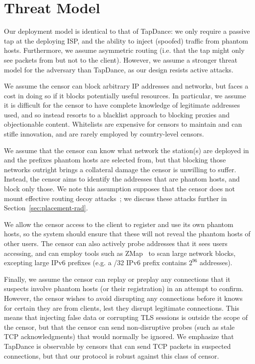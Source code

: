 \documentclass[sigconf]{acmart}
\begin{document}




\section{Threat Model}


Our deployment model is identical to that of TapDance: we only require a passive
tap at the deploying ISP, and the ability to inject (spoofed) traffic from phantom
hosts.
Furthermore, we assume
asymmetric routing (i.e. that the tap might only see packets from but not to the
client).
However, we assume a stronger threat model for the adversary than
TapDance, as our design resists active attacks.

We assume the censor can block arbitrary IP addresses and networks, but faces a
cost in doing so if it blocks potentially useful resources. In particular, we
assume it is difficult for the censor to have complete knowledge of legitimate
addresses used, and so instead resorts to a blacklist approach to blocking
proxies and objectionable content.
Whitelists are expensive for censors to maintain and can stifle
innovation, and are rarely employed by country-level censors.

We assume that the censor can know what network the \scheme station(s) are
deployed in and the prefixes phantom hosts are selected from, but that blocking those
networks outright brings a collateral
damage the censor is unwilling to suffer. Instead, the censor aims to identify
the addresses that are phantom hosts, and block only those. We note this
assumption supposes that the censor does not mount effective routing
decoy attacks~\cite{rad12,true-cost-rad}; we discuss these attacks further in Section~\ref{sec:placement-rad}.

We allow the censor access to the client to register and use its own phantom hosts, 
so the system should ensure that these will not reveal the phantom hosts of other users. The
censor can also actively probe addresses that it sees users accessing, and can
employ tools such as ZMap~\cite{zmap13} to scan large network blocks, excepting
large IPv6 prefixes (e.g. a /32 IPv6 prefix contains $2^{96}$ addresses).

Finally, we assume the censor can replay or preplay any connections that it
suspects involve phantom hosts (or their registration) in an attempt to confirm.
However, the censor wishes to avoid disrupting any connections before it
knows for certain they are from \scheme clients, lest they disrupt legitimate
connections. This means that injecting false data or corrupting TLS sessions is
outside the scope of the censor, but that the censor can send non-disruptive
probes (such as stale TCP acknowledgments) that would normally
be ignored. We emphasize that TapDance is observable by censors that can send
TCP packets in suspected connections, but that our protocol is robust against
this class of censor.
\end{document}

